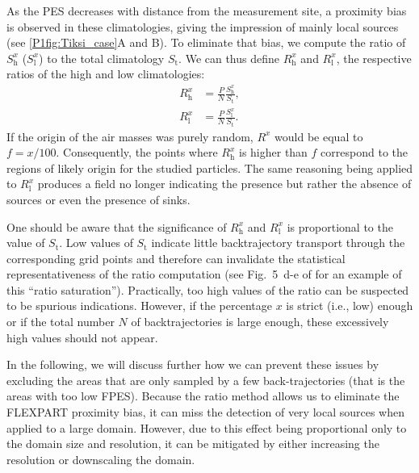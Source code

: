             As the PES decreases with distance from the measurement site, a proximity bias is observed in these climatologies, giving the impression of mainly local sources (see \cref{P1fig:Tiksi_case}A and B). 
            To eliminate that bias, we compute the ratio of $S_{\text{h}}^{x}$ ($S_{\text{l}}^{x}$) to the total climatology $S_\text{t}$.
            We can thus define $R_\text{h}^{x}$ and $R_\text{l}^{x}$, the respective ratios of the high and low climatologies:
            \begin{align}
                \label{P1eq:ratio_high}
                R_\text{h}^{x} &= \frac{P}{N}\frac{S_\text{h}^{x}}{S_\text{t}},\\
                \label{P1eq:ratio_low}
                R_\text{l}^{x} &= \frac{P}{N}\frac{S_\text{l}^{x}}{S_\text{t}}.
            \end{align}
            If the origin of the air masses was purely random, $R^{x}$ would be equal to $f = x/100$.
            Consequently, the points where $R_\text{h}^{x}$ is higher than $f$ correspond to the regions of likely origin for the studied particles.
            The same reasoning being applied to $R_\text{l}^{x}$ produces a field no longer indicating the presence but rather the absence of sources or even the presence of sinks.

            One should be aware that the significance of $R_\text{h}^{x}$ and $R_\text{l}^{x}$ is proportional to the value of $S_\text{t}$. Low values of $S_\text{t}$ indicate little backtrajectory transport through the corresponding grid points and therefore can invalidate the statistical representativeness of the ratio computation (see Fig.~5~d-e of \citet{irish_ice_2019} for an example of this ``ratio saturation'').
            Practically, too high values of the ratio can be suspected to be spurious indications. However, if the percentage $x$ is strict (i.e., low) enough or if the total number $N$ of backtrajectories is large enough, these excessively high values should not appear.

            In the following, we will discuss further how we can prevent these issues by excluding the areas that are only sampled by a few back-trajectories (that is the areas with too low FPES).
            Because the ratio method allows us to eliminate the FLEXPART proximity bias, it can miss the detection of very local sources when applied to a large domain. However, due to this effect being proportional only to the domain size and resolution, it can be mitigated by either increasing the resolution or downscaling the domain.

